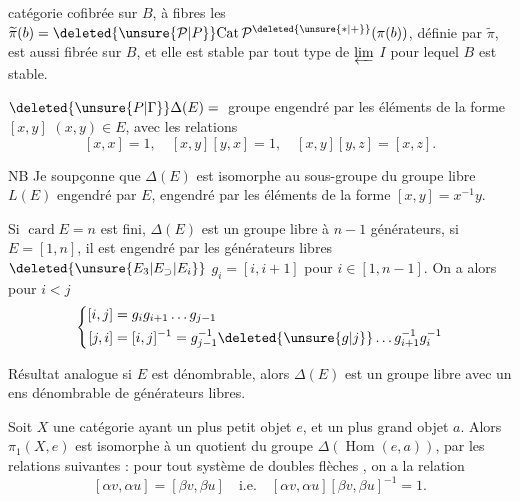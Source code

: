catégorie cofibrée sur $B$, à fibres les $\widetilde\pi(b)=\deleted{\unsure{\mathcal P|P}}\mathrm{Cat}\,\mathcal P^{\deleted{\unsure{*|+}}}(\pi(b))$, définie par $\widetilde\pi$, est aussi fibrée sur $B$,  et elle est stable par tout type de $\varprojlim$   $I$  pour lequel $B$  est stable.

$\deleted{\unsure{P|\Gamma}}\Delta(E)={}$ groupe engendré par les éléments de la forme $[x,y]$ $(x,y)\in E$, avec les relations
\[
[x,x]=1,\quad [x,y][y,x]=1,\quad [x,y][y,z]=[x,z].
\]

NB Je soupçonne que $\Delta(E)$ est isomorphe au sous-groupe du groupe libre $L(E)$ engendré par $E$, engendré par les éléments de la forme $[x,y]=x^{-1}y$.

Si $\operatorname{card}E=n$ est fini, $\Delta(E)$ est un groupe libre à $n-1$ générateurs, si $E=[1,n]$, il est engendré par les générateurs libres $\deleted{\unsure{E_3|E_{\supset}|E_i}}$ $g_i=[i,i+1]$ pour $i\in[1,n-1]$. On a alors pour $i<j$
\[
\left\{\begin{aligned}
[i,j]&=g_ig_{i+1}\ldots g_{j-1}\\
[j,i]&=[i,j]^{-1}=g_{j-1}^{-1}\deleted{\unsure{g|j}}\ldots g_{i+1}^{-1}g_i^{-1}
\end{aligned}\right.
\]

Résultat analogue si $E$ est dénombrable, alors $\Delta(E)$ est un groupe libre avec un ens dénombrable de générateurs libres.

Soit $X$ une catégorie ayant un plus petit objet $e$, et un plus grand objet $a$. Alors $\pi_1(X,e)$ est isomorphe  à un quotient du groupe $\Delta(\operatorname{Hom}(e,a))$, par les relations suivantes : pour tout système de doubles flèches
,  on a la relation
\[
\boxed{[\alpha v,\alpha u]=[\beta v,\beta u]}\quad\text{i.e.}\quad
[\alpha v,\alpha u][\beta v,\beta u]^{-1}=1.
\]

